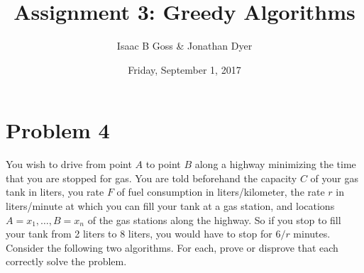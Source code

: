 \documentclass{article}
\author{Isaac B Goss \& Jonathan Dyer}
\title{Assignment 3: Greedy Algorithms}
\date{Friday, September 1, 2017}
\providecommand{\prob}[1]{\section*{Problem #1}}
\begin{document}
\maketitle

    \prob{4}
    You wish to drive from point $A$ to point $B$ along a highway minimizing the time that you are stopped for gas. You are told beforehand the capacity $C$ of your gas tank in liters, you rate $F$ of fuel consumption in liters/kilometer, the rate $r$ in liters/minute at which you can fill your tank at a gas station, and locations $A = x_1, \dots, B = x_n$ of the gas stations along the highway. So if you stop to fill your tank from 2 liters to 8 liters, you would have to stop for $6/r$ minutes. Consider the following two algorithms. For each, prove or disprove that each correctly solve the problem.
    
\end{document}
